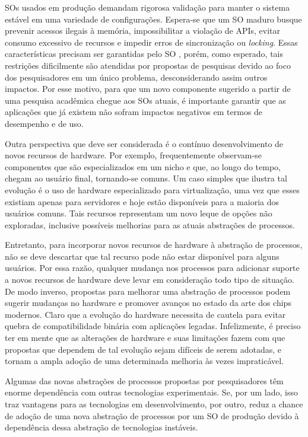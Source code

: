 SOs usados em produção demandam rigorosa validação para manter o sistema
estável em uma variedade de configurações. Espera-se que um SO maduro busque
prevenir acessos ilegais à memória, impossibilitar a violação de APIs, evitar
consumo excessivo de recursos e impedir erros de sincronização ou
\textit{locking}. Essas características precisam ser garantidas pelo SO
\citep{mondrix}, porém, como esperado, tais restrições dificilmente são
atendidas por propostas de pesquisas devido ao foco dos pesquisadores
em um único problema, desconsiderando assim outros impactos. Por esse motivo,
para que um novo componente sugerido a partir de uma pesquisa acadêmica chegue
aos SOs atuais, é importante garantir que as aplicações que já existem não
sofram impactos negativos em termos de desempenho e de uso.

Outra perspectiva que deve ser considerada é o contínuo desenvolvimento de novos
recursos de hardware. Por exemplo, frequentemente observam-se componentes que
são especializados em um nicho e que, ao longo do tempo, chegam ao usuário
final, tornando-se comuns. Um caso simples que ilustra tal evolução é o
uso de hardware especializado para virtualização, uma vez que esses existiam
apenas para servidores e hoje estão disponíveis para a maioria dos usuários
comuns. Tais recursos representam um novo leque de opções não exploradas,
inclusive possíveis melhorias para as atuais abstrações de processos.

Entretanto, para incorporar novos recursos de hardware à abstração de processos,
não se deve descartar que tal recurso pode não estar disponível para alguns
usuários. Por essa razão, qualquer mudança nos processos para adicionar suporte
a novos recursos de hardware deve levar em consideração todo tipo de situação.
De modo inverso, propostas para melhorar uma abstração de processos podem
sugerir mudanças no hardware e promover avanços no estado da arte dos chips
modernos. Claro que a evolução do hardware necessita de cautela para evitar
quebra de compatibilidade binária com aplicações legadas. Infelizmente, é
preciso ter em mente que as alterações de hardware e suas limitações fazem com
que propostas que dependem de tal evolução sejam difíceis de serem adotadas, e
tornam a ampla adoção de uma determinada melhoria às vezes impraticável.

Algumas das novas abstrações de processos propostas por pesquisadores têm
enorme dependência com outras tecnologias experimentais. Se, por um lado, isso
traz vantagens para as tecnologias em desenvolvimento, por outro, reduz a chance
de adoção de uma nova abstração de processos por um SO de produção devido à
dependência dessa abstração de tecnologias instáveis.

